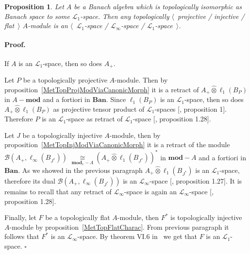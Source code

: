 \documentclass[12pt]{article}
\newcommand{\projtens}{\mathbin{\widehat{\otimes}}}
\newcommand{\isom}[1]{\mathop{\mathbin{\cong}}\limits_{#1}}
\newtheorem{proposition}[theorem]{Proposition}
\renewenvironment{proof}{\paragraph{Proof.}}{\hfill$\square$\medskip}
\begin{document}
\begin{proposition}\label{TopProjInjFlatModOverMthscrL1SpCharac} Let $A$ be a
    Banach algebra which is topologically isomorphic as Banach space to some
    $\mathscr{L}_1$-space. Then any topologically $\langle$~projective /
    injective / flat~$\rangle$ $A$-module is an $\langle$~$\mathscr{L}_1$-space
    / $\mathscr{L}_\infty$-space / $\mathscr{L}_1$-space~$\rangle$.
\end{proposition}
\begin{proof} If $A$ is an $\mathscr{L}_1$-space, then so does $A_+$.

    Let $P$ be a topologically projective $A$-module. Then by
    proposition~\ref{MetTopProjModViaCanonicMorph} it is a retract of
    $A_+\projtens \ell_1(B_P)$ in $A-\mathbf{mod}$ and a fortiori in 
    $\mathbf{Ban}$. Since $\ell_1(B_P)$ is an $\mathscr{L}_1$-space, 
    then so does $A_+\projtens\ell_1(B_P)$ as projective tensor product of
    $\mathscr{L}_1$-spaces [\cite{GonzDPPInTensProd}, proposition 1]. Therefore
    $P$ is an $\mathscr{L}_1$-space as retract of $\mathscr{L}_1$-space
    [\cite{BourgNewClOfLpSp}, proposition 1.28].

    Let $J$ be a topologically injective $A$-module, then by
    proposition~\ref{MetTopInjModViaCanonicMorph} it is a retract of the module
    $\mathcal{B}(A_+,\ell_\infty(B_{J^*}))$
    $\isom{\mathbf{mod}_1-A}{(A_+\projtens\ell_1(B_{J^*}))}^*$ in 
    $\mathbf{mod}-A$ and a fortiori in $\mathbf{Ban}$. As we showed 
    in the previous paragraph $A_+\projtens\ell_1(B_{J^*})$ is an 
    $\mathscr{L}_1$-space, therefore its dual 
    $\mathcal{B}(A_+,\ell_\infty(B_{J^*}))$ is an
    $\mathscr{L}_\infty$-space [\cite{BourgNewClOfLpSp}, proposition 1.27]. It
    is remains to recall that any retract of $\mathscr{L}_\infty$-space is again
    an $\mathscr{L}_\infty$-space [\cite{BourgNewClOfLpSp}, proposition 1.28].

    Finally, let $F$ be a topologically flat $A$-module, then $F^*$ is
    topologically injective $A$-module by proposition~\ref{MetTopFlatCharac}.
    From previous paragraph it follows that $F^*$ is an
    $\mathscr{L}_\infty$-space. By theorem VI.6 in~\cite{StegRethNucOpL1LInfSp}
    we get that $F$ is an $\mathscr{L}_1$-space.
\end{proof}
\end{document}

